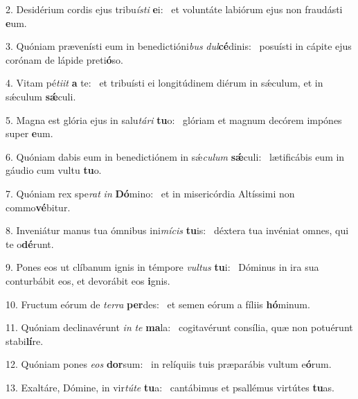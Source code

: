 2. Desidérium cordis ejus tribu\textit{ís}\textit{ti} \textbf{e}i: \ast\  et voluntáte labiórum ejus non fraudásti \textbf{e}um.\

3. Quóniam prævenísti eum in benedictióni\textit{bus} \textit{dul}\textbf{cé}dinis: \ast\  posuísti in cápite ejus corónam de lápide preti\textbf{ó}so.\

4. Vitam pé\textit{ti}\textit{it} \textbf{a} te: \ast\  et tribuísti ei longitúdinem diérum in sǽculum, et in sǽculum \textbf{sǽ}culi.\

5. Magna est glória ejus in salu\textit{tá}\textit{ri} \textbf{tu}o: \ast\  glóriam et magnum decórem impónes super \textbf{e}um.\

6. Quóniam dabis eum in benedictiónem in sǽ\textit{cu}\textit{lum} \textbf{sǽ}culi: \ast\  lætificábis eum in gáudio cum vultu \textbf{tu}o.\

7. Quóniam rex spe\textit{rat} \textit{in} \textbf{Dó}mino: \ast\  et in misericórdia Altíssimi non commo\textbf{vé}bitur.\

8. Inveniátur manus tua ómnibus ini\textit{mí}\textit{cis} \textbf{tu}is: \ast\  déxtera tua invéniat omnes, qui te o\textbf{dé}runt.\

9. Pones eos ut clíbanum ignis in témpore \textit{vul}\textit{tus} \textbf{tu}i: \ast\  Dóminus in ira sua conturbábit eos, et devorábit eos \textbf{i}gnis.\

10. Fructum eórum de \textit{ter}\textit{ra} \textbf{per}des: \ast\  et semen eórum a fíliis \textbf{hó}minum.\

11. Quóniam declinavérunt \textit{in} \textit{te} \textbf{ma}la: \ast\  cogitavérunt consília, quæ non potuérunt stabi\textbf{lí}re.\

12. Quóniam pones \textit{e}\textit{os} \textbf{dor}sum: \ast\  in relíquiis tuis præparábis vultum e\textbf{ó}rum.\

13. Exaltáre, Dómine, in vir\textit{tú}\textit{te} \textbf{tu}a: \ast\  cantábimus et psallémus virtútes \textbf{tu}as.\

